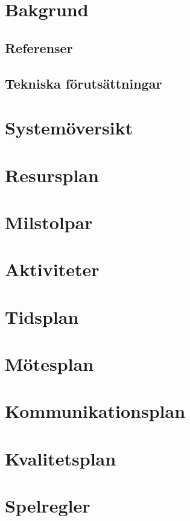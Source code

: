 \documentclass{article}
\begin{document}
\section{Bakgrund}

\subsection{Referenser}

\subsection{Tekniska förutsättningar}

\section{Systemöversikt}

\section{Resursplan}

\section{Milstolpar}

\section{Aktiviteter}

\section{Tidsplan}

\section{Mötesplan}

\section{Kommunikationsplan}

\section{Kvalitetsplan}

\section{Spelregler}
\end{document}
